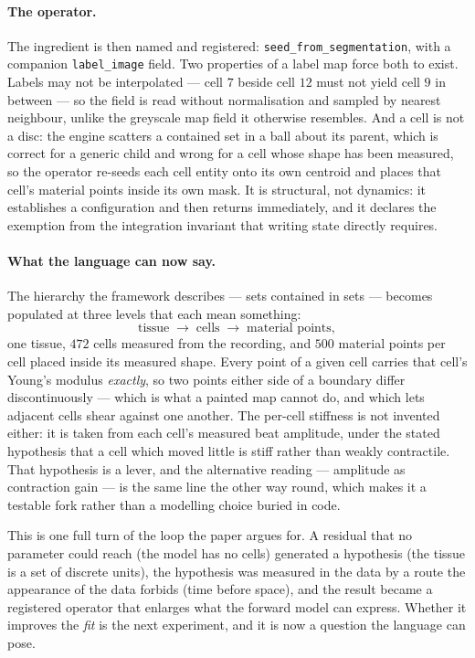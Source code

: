 \documentclass[11pt]{article}
\newcommand{\code}[1]{\texttt{#1}}
\begin{document}
\paragraph{The operator.} The ingredient is then named and registered:
\code{seed\_from\_segmentation}, with a companion \code{label\_image} field. Two properties of a
label map force both to exist. Labels may not be interpolated --- cell $7$ beside cell $12$ must not
yield cell $9$ in between --- so the field is read without normalisation and sampled by nearest
neighbour, unlike the greyscale map field it otherwise resembles. And a cell is not a disc: the
engine scatters a contained set in a ball about its parent, which is correct for a generic child
and wrong for a cell whose shape has been measured, so the operator re-seeds each cell entity onto
its own centroid and places that cell's material points inside its own mask. It is structural, not
dynamics: it establishes a configuration and then returns immediately, and it declares the
exemption from the integration invariant that writing state directly requires.

\paragraph{What the language can now say.} The hierarchy the framework describes --- sets contained
in sets --- becomes populated at three levels that each mean something:
\[
\text{tissue} \;\longrightarrow\; \text{cells} \;\longrightarrow\; \text{material points},
\]
one tissue, $472$ cells measured from the recording, and $500$ material points per cell placed
inside its measured shape. Every point of a given cell carries that cell's Young's modulus
\emph{exactly}, so two points either side of a boundary differ discontinuously --- which is what a
painted map cannot do, and which lets adjacent cells shear against one another. The per-cell
stiffness is not invented either: it is taken from each cell's measured beat amplitude, under the
stated hypothesis that a cell which moved little is stiff rather than weakly contractile. That
hypothesis is a lever, and the alternative reading --- amplitude as contraction gain --- is the same
line the other way round, which makes it a testable fork rather than a modelling choice buried in
code.

This is one full turn of the loop the paper argues for. A residual that no parameter could reach
(the model has no cells) generated a hypothesis (the tissue is a set of discrete units), the
hypothesis was measured in the data by a route the appearance of the data forbids (time before
space), and the result became a registered operator that enlarges what the forward model can
express. Whether it improves the \emph{fit} is the next experiment, and it is now a question the
language can pose.
\end{document}

